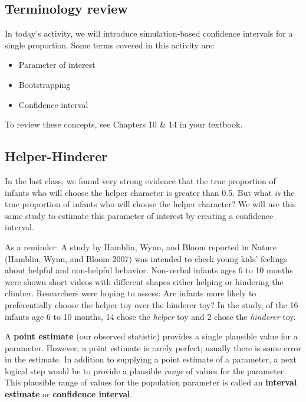 \documentclass[
]{report}
\begin{document}
\subsection{Terminology review}\label{terminology-review-6}

In today's activity, we will introduce simulation-based confidence intervals for a single proportion. Some terms covered in this activity are:

\begin{itemize}
\item
  Parameter of interest
\item
  Bootstrapping
\item
  Confidence interval
\end{itemize}

To review these concepts, see Chapters 10 \& 14 in your textbook.

\subsection{Helper-Hinderer}\label{helper-hinderer-2}

In the last class, we found very strong evidence that the true proportion of infants who will choose the helper character is greater than 0.5. But what \emph{is} the true proportion of infants who will choose the helper character? We will use this same study to estimate this parameter of interest by creating a confidence interval.

As a reminder: A study by Hamblin, Wynn, and Bloom reported in Nature (Hamblin, Wynn, and Bloom 2007) was intended to check young kids' feelings about helpful and non-helpful behavior. Non-verbal infants ages 6 to 10 months were shown short videos with different shapes either helping or hindering the climber. Researchers were hoping to assess: Are infants more likely to preferentially choose the helper toy over the hinderer toy? In the study, of the 16 infants age 6 to 10 months, 14 chose the \emph{helper} toy and 2 chose the \emph{hinderer} toy.

A \textbf{point estimate} (our observed statistic) provides a single plausible value for a parameter. However, a point estimate is rarely perfect; usually there is some error in the estimate. In addition to supplying a point estimate of a parameter, a next logical step would be to provide a plausible \emph{range} of values for the parameter. This plausible range of values for the population parameter is called an \textbf{interval estimate} or \textbf{confidence interval}.
\end{document}
